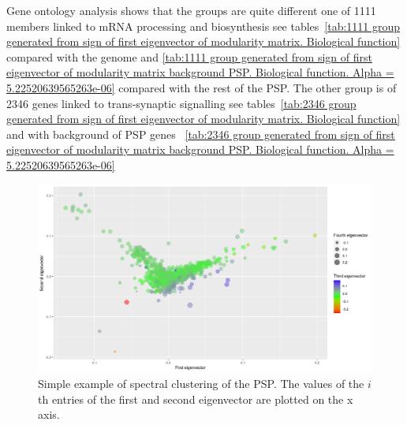 Gene ontology analysis shows that the groups are quite different one of 1111 members linked to mRNA processing and biosynthesis see tables~\ref{tab:1111 group generated from sign of first eigenvector of modularity matrix. Biological function} compared with the genome and \ref{tab:1111 group generated from sign of first eigenvector of modularity matrix background PSP. Biological function. Alpha = 5.22520639565263e-06} compared with the rest of the PSP. The other group is of 2346 genes linked to trans-synaptic signalling see tables~\ref{tab:2346 group generated from sign of first eigenvector of modularity matrix. Biological function} and with background of PSP genes ~\ref{tab:2346 group generated from sign of first eigenvector of modularity matrix background PSP. Biological function. Alpha = 5.22520639565263e-06}
\begin{figure}
    \centering
    \includegraphics[width=\textwidth]{images/Rplot_eigenvectors_of_PSP_modularity_matrix.png}
    \caption{Simple example of spectral clustering of the PSP. The values of the $i$th entries of the first and second eigenvector are plotted on the x axis.}
    \label{fig:simple example of spectral clustering}
\end{figure}

